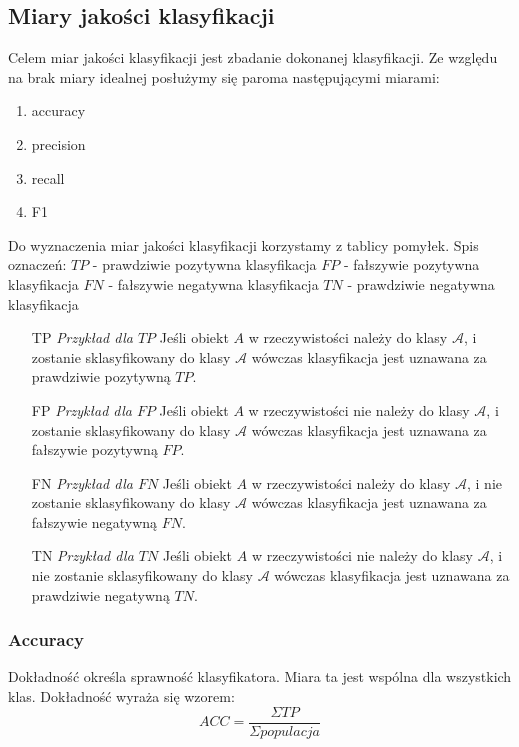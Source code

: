 \documentclass{classrep}
\begin{document}
\subsection{Miary jakości klasyfikacji}
Celem miar jakości klasyfikacji jest zbadanie dokonanej klasyfikacji. Ze względu na brak miary idealnej posłużymy się paroma następującymi miarami:
\begin{enumerate}
\item{accuracy}
\item{precision}
\item{recall}
\item{F1}
\end{enumerate}
Do wyznaczenia miar jakości klasyfikacji korzystamy z tablicy pomyłek. Spis oznaczeń:
\newline $TP$ - prawdziwie pozytywna klasyfikacja
\newline $FP$ - fałszywie pozytywna klasyfikacja
\newline $FN$ - fałszywie negatywna klasyfikacja
\newline $TN$ - prawdziwie negatywna klasyfikacja
\newline
\begin{enumerate}
\item[TP]{\textit{Przykład dla $TP$} Jeśli obiekt $A$ w rzeczywistości należy do klasy $\mathcal{A}$, i zostanie sklasyfikowany do klasy $\mathcal{A}$ wówczas klasyfikacja jest uznawana za prawdziwie pozytywną $TP$.}
\item[FP]{\textit{Przykład dla $FP$} Jeśli obiekt $A$ w rzeczywistości nie należy do klasy $\mathcal{A}$, i zostanie sklasyfikowany do klasy $\mathcal{A}$ wówczas klasyfikacja jest uznawana za fałszywie pozytywną $FP$.}
\item[FN]{\textit{Przykład dla $FN$} Jeśli obiekt $A$ w rzeczywistości należy do klasy $\mathcal{A}$, i nie zostanie sklasyfikowany do klasy $\mathcal{A}$ wówczas klasyfikacja jest uznawana za fałszywie negatywną $FN$.}
\item[TN]{\textit{Przykład dla $TN$} Jeśli obiekt $A$ w rzeczywistości nie należy do klasy $\mathcal{A}$, i nie zostanie sklasyfikowany do klasy $\mathcal{A}$ wówczas klasyfikacja jest uznawana za prawdziwie negatywną $TN$.}
\end{enumerate}


\subsubsection{Accuracy}
Dokładność określa sprawność klasyfikatora. Miara ta jest wspólna dla wszystkich klas.
Dokładność wyraża się wzorem:
\begin{equation}
ACC=\frac{\Sigma TP}{\Sigma populacja} \label{eq:eps}
\end{equation}
\end{document}
